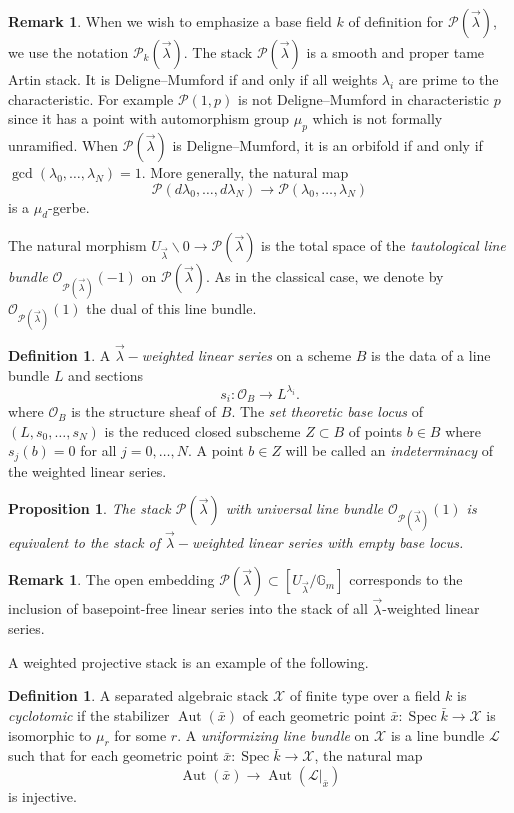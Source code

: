 \documentclass[a4paper,12pt]{amsart}
\newtheorem{prop}[thm]{Proposition}
\theoremstyle{definition}
\newtheorem{defn}[thm]{Definition}
\newtheorem{rmk}[thm]{Remark}
\newcommand{\bG}{\mathbb{G}}
\newcommand{\cX}{\mathcal{X}}
\newcommand{\cO}{\mathcal{O}}
\newcommand{\cL}{\mathcal{L}}
\newcommand{\Pcv}{\mathcal{P}(\vec{\lambda})}
\newcommand{\Pc}{\mathcal{P}}
\newcommand{\lambdavec}{{\vec{\lambda}}}
\DeclareMathOperator{\Spec}{Spec}
\DeclareMathOperator{\Aut}{Aut}
\renewcommand{\setminus}{\smallsetminus}
\begin{document}
	\begin{rmk}\label{rmk:wtprojtame} 
		When we wish to emphasize a base field $k$ of definition for $\Pcv$, we use the notation $\Pc_{k}(\vec\lambda)$. The stack $\Pcv$ is a smooth and proper tame Artin stack. It is Deligne--Mumford if and only if all weights $\lambda_i$ are prime to the characteristic. For example $\Pc(1,p)$ is not Deligne--Mumford in characteristic $p$ since it has a point with automorphism group $\mu_p$ which is not formally unramified. When $\Pcv$ is Deligne--Mumford, it is an orbifold if and only if $\gcd(\lambda_0, \dotsc, \lambda_N)=1$. More generally, the natural map
		$$
		\Pc(d\lambda_0, \dotsc, d\lambda_N) \to \Pc(\lambda_0, \ldots, \lambda_N)
		$$
		is a $\mu_d$-gerbe.
	\end{rmk}
	
	
	The natural morphism $U_\lambdavec \setminus 0 \to \Pcv$ is the total space of the \emph{tautological line bundle} $\mathcal{O}_{\Pcv}(-1)$ on $\Pcv$. As in the classical case, we denote by $\mathcal{O}_{\Pcv}(1)$ the dual of this line bundle. 
	
	\begin{defn}\label{defn:wls}
		A \emph{$\lambdavec-$weighted linear series} on a scheme $B$ is the data of a line bundle $L$ and sections
		$$
		s_i : \cO_B \to L^{\lambda_i}. 
		$$
		where $\cO_B$ is the structure sheaf of $B$. The \emph{set theoretic base locus} of $(L,s_0, \ldots, s_N)$ is the reduced closed subscheme $Z \subset B$ of points $b \in B$ where $s_j(b) = 0$ for all $j = 0, \ldots, N$. A point $b \in Z$ will be called an \emph{indeterminacy} of the weighted linear series. 
	\end{defn}
	
	\begin{prop}\cite[Lem. 2.1.3]{AH} The stack $\Pcv$ with universal line bundle $\cO_{\Pcv}(1)$ is equivalent to the stack of $\lambdavec-$weighted linear series with empty base locus. 
	\end{prop}
	
	\begin{rmk}
		The open embedding $\Pcv \subset [U_{\lambdavec}/\bG_m]$ corresponds to the inclusion of basepoint-free linear series into the stack of all $\lambdavec$-weighted linear series. 
	\end{rmk}
	
	A weighted projective stack is an example of the following. 
	
	\begin{defn}\label{def:cyc_uni}
		A separated algebraic stack $\cX$ of finite type over a field $k$ is \emph{cyclotomic} if the stabilizer $\Aut(\bar{x})$ of each geometric point $\bar{x} : \Spec \bar{k} \to \cX$ is isomorphic to $\mu_r$ for some $r$. A \emph{uniformizing line bundle} on $\cX$ is a line bundle $\cL$ such that for each geometric point $\bar{x} : \Spec \bar{k} \to \cX$, the natural map
		$$
		\Aut(\bar{x}) \to \Aut(\cL|_{\bar{x}})
		$$
		is injective. 
	\end{defn}
	
\end{document}

